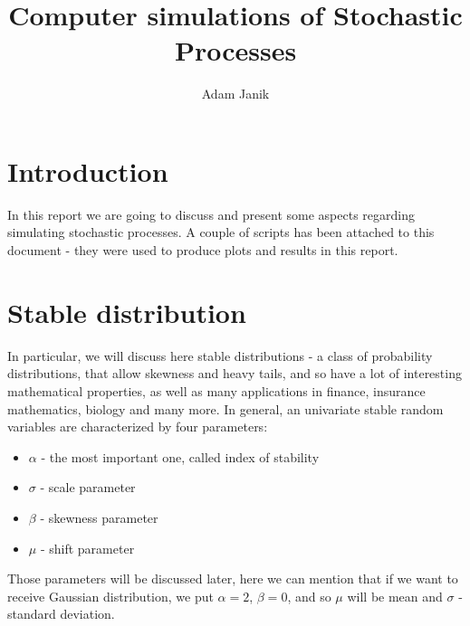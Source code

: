 \documentclass{article}
\title{Computer simulations of Stochastic Processes}
\author{Adam Janik}
\begin{document}
	\maketitle
	\newpage
	
	\section{Introduction}
	In this report we are going to discuss and present some aspects regarding simulating stochastic processes. A couple of scripts has been attached to this document - they were used to produce plots and results in this report.
	\section{Stable distribution}
	In particular, we will discuss here stable distributions - a class of probability distributions, that allow skewness and heavy tails, and so have a lot of interesting mathematical properties, as well as many applications in finance, insurance mathematics, biology and many more.
	In general, an univariate stable random variables are characterized by four parameters:
	\begin{itemize}
	\item $\alpha$ - the most important one, called index of stability
	\item $\sigma$ - scale parameter
	\item $\beta$ - skewness parameter
	\item $\mu$ - shift parameter
	\end{itemize}
	Those parameters will be discussed later, here we can mention that if we want to receive Gaussian distribution, we put $\alpha = 2$, $\beta = 0$, and so $\mu$ will be mean and $\sigma$ - standard deviation.
\end{document}

